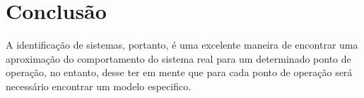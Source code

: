 \documentclass[11pt]{article}
\begin{document}
    \hypertarget{conclusuxe3o}{%
\section{Conclusão}\label{conclusuxe3o}}

    A identificação de sistemas, portanto, é uma excelente maneira de
encontrar uma aproximação do comportamento do sistema real para um
determinado ponto de operação, no entanto, desse ter em mente que para
cada ponto de operação será necessário encontrar um modelo especifico.


    
    
    
\end{document}
